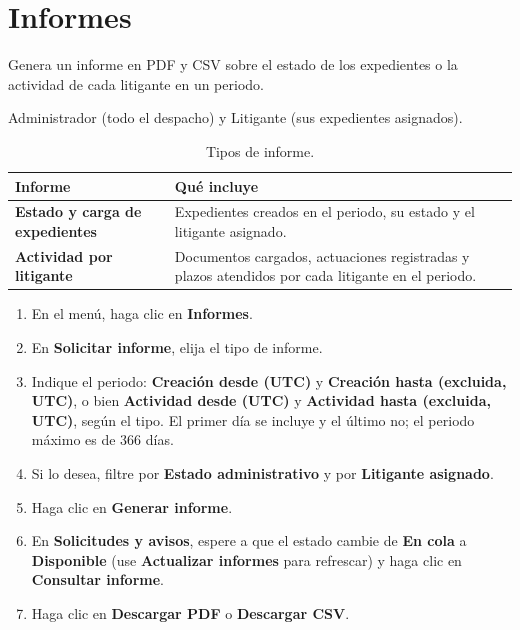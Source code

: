 \chapter{Informes}\label{cap:informes}

\paraque Genera un informe en PDF y CSV sobre el estado de los expedientes o
la actividad de cada litigante en un periodo.

\disponible Administrador (todo el despacho) y Litigante (sus expedientes
asignados).

\begin{table}[H]
  \centering
  \caption{Tipos de informe.}\label{tab:tipos-informe}
  \begin{tabularx}{\textwidth}{L{4.8cm} Y}
    \toprule
    \textbf{Informe} & \textbf{Qué incluye} \\
    \midrule
    \textbf{Estado y carga de expedientes}
      & Expedientes creados en el periodo, su estado y el litigante
        asignado. \\
    \textbf{Actividad por litigante}
      & Documentos cargados, actuaciones registradas y plazos atendidos por
        cada litigante en el periodo. \\
    \bottomrule
  \end{tabularx}
\end{table}

\pasos
\begin{enumerate}
  \item En el menú, haga clic en \textbf{Informes}.
  \item En \textbf{Solicitar informe}, elija el tipo de informe.
  \item Indique el periodo: \textbf{Creación desde (UTC)} y
        \textbf{Creación hasta (excluida, UTC)}, o bien
        \textbf{Actividad desde (UTC)} y
        \textbf{Actividad hasta (excluida, UTC)}, según el tipo. El primer
        día se incluye y el último no; el periodo máximo es de 366 días.
  \item Si lo desea, filtre por \textbf{Estado administrativo} y por
        \textbf{Litigante asignado}.
  \item Haga clic en \textbf{Generar informe}.
  \item En \textbf{Solicitudes y avisos}, espere a que el estado cambie de
        \textbf{En cola} a \textbf{Disponible} (use \textbf{Actualizar
        informes} para refrescar) y haga clic en \textbf{Consultar informe}.
  \item Haga clic en \textbf{Descargar PDF} o \textbf{Descargar CSV}.
\end{enumerate}

